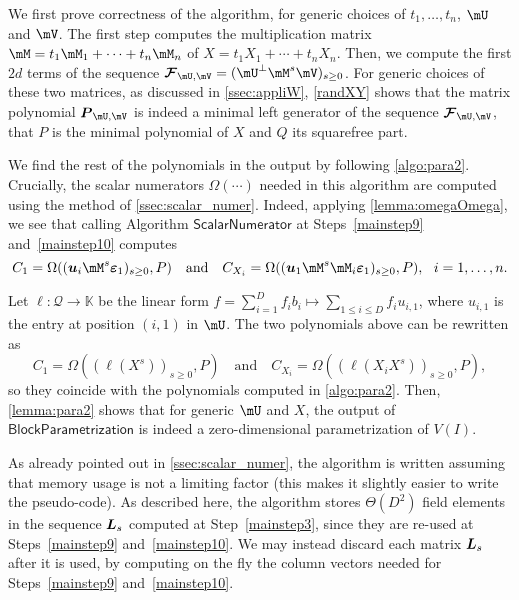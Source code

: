 \documentclass[12pt]{article}
\newcommand{\mat}[1]{\bm{\MakeUppercase{#1}}} %
\newcommand{\row}[1]{\bm{\MakeLowercase{#1}}} %
\newcommand{\col}[1]{\bm{\MakeLowercase{#1}}} %
\newcommand{\seq}{\mat{\mathcal{F}}} %
\newcommand{\minpoly}{P}
\newcommand{\mainalgoname}{\mathsf{ BlockParametrization}}
\newcommand{\lf}{X}
\newcommand{\residueI}{\mathscr{Q}}
\newcommand{\sqfree}{Q}
\def\K{\mathbb{K}}
\def\K {\ensuremath{\mathbb{K}}}
\begin{document}
We first prove correctness of the algorithm, for generic choices of
$t_1,\dots,t_n$, $\mU$ and $\mV$. The first step computes the
multiplication matrix $\mM=t_1 \mM_1 + \cdots + t_n \mM_n$ of $\lf=t_1
X_1 + \cdots + t_n X_n$.
Then, we compute the first $2d$ terms of the sequence $\seq_{\mU,\mV}=
(\mU^{\perp}\mM^s\mV)_{s\ge 0}$. For generic choices of these two
matrices, as discussed in \cref{ssec:appliW}, \cref{randXY} shows that
the matrix polynomial $\mat{P}_{\mU,\mV}$ is indeed a minimal left
generator of the sequence $\seq_{\mU,\mV}$, that $\minpoly$ is the minimal 
polynomial of $\lf$ and $\sqfree$ its squarefree part.

We find the rest of the polynomials in the output by following
\cref{algo:para2}. Crucially, the scalar numerators $\Omega(\cdots)$
needed in this algorithm are computed using the method of
\cref{ssec:scalar_numer}. Indeed, applying  \cref{lemma:omegaOmega},
we see that calling  Algorithm $\mathsf{ ScalarNumerator}$
at Steps~\ref{mainstep9} and~\ref{mainstep10}
computes $$C_1 = \Omega((\row{u}_i \mM^s \col{\varepsilon}_1)_{s \ge
  0}, \minpoly) \quad\text{and}\quad C_{X_i} = \Omega((\row{u}_1 \mM^s
\mM_i \col{\varepsilon}_1)_{s \ge 0}, \minpoly),\ \ i=1,\dots,n.$$ 

Let $\ell:\residueI \to \K$ be the linear form $f = \sum_{i=1}^D f_i b_i \mapsto 
\sum_{1 \le i \le D} f_i u_{i,1}$, where $u_{i,1}$ is the entry at position
$(i,1)$ in $\mU$. The two polynomials above can be rewritten
as 
$$C_1 = \Omega( (\ell(X^s))_{s \ge 0}, \minpoly) \quad\text{and}\quad
C_{X_i} = \Omega( (\ell(X_i X^s))_{s \ge 0}, \minpoly),$$ so they
coincide with the polynomials computed in \cref{algo:para2}.  Then,
\cref{lemma:para2} shows that for generic $\mU$ and $\lf$, the output
of $\mainalgoname$
is indeed a zero-dimensional parametrization of $V(I)$.  

\begin{remark}
  As already pointed out in \cref{ssec:scalar_numer}, the algorithm is
  written assuming that memory usage is not a limiting factor (this
  makes it slightly easier to write the pseudo-code). As described
  here, the algorithm stores $\Theta(D^2)$ field elements in the
  sequence $\mat{L}_s$ computed at Step~\ref{mainstep3}, since they
  are re-used at Steps~\ref{mainstep9} and~\ref{mainstep10}.  We may
  instead discard each matrix $\mat{L}_s$ after it is used, by
  computing on the fly the column vectors needed for Steps~\ref{mainstep9}
  and~\ref{mainstep10}.
\end{remark}
\end{document}
